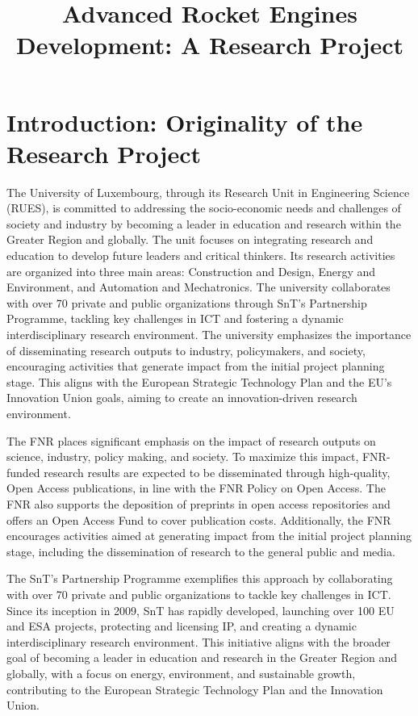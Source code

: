 \documentclass{article}
\title{Advanced Rocket Engines Development: A Research Project}
\author{}
\date{}
\begin{document}
\maketitle

\section{Introduction: Originality of the Research Project}

The University of Luxembourg, through its Research Unit in Engineering Science (RUES), is committed to addressing the socio-economic needs and challenges of society and industry by becoming a leader in education and research within the Greater Region and globally. The unit focuses on integrating research and education to develop future leaders and critical thinkers. Its research activities are organized into three main areas: Construction and Design, Energy and Environment, and Automation and Mechatronics. The university collaborates with over 70 private and public organizations through SnT’s Partnership Programme, tackling key challenges in ICT and fostering a dynamic interdisciplinary research environment. The university emphasizes the importance of disseminating research outputs to industry, policymakers, and society, encouraging activities that generate impact from the initial project planning stage. This aligns with the European Strategic Technology Plan and the EU's Innovation Union goals, aiming to create an innovation-driven research environment.

The FNR places significant emphasis on the impact of research outputs on science, industry, policy making, and society. To maximize this impact, FNR-funded research results are expected to be disseminated through high-quality, Open Access publications, in line with the FNR Policy on Open Access. The FNR also supports the deposition of preprints in open access repositories and offers an Open Access Fund to cover publication costs. Additionally, the FNR encourages activities aimed at generating impact from the initial project planning stage, including the dissemination of research to the general public and media.

The SnT’s Partnership Programme exemplifies this approach by collaborating with over 70 private and public organizations to tackle key challenges in ICT. Since its inception in 2009, SnT has rapidly developed, launching over 100 EU and ESA projects, protecting and licensing IP, and creating a dynamic interdisciplinary research environment. This initiative aligns with the broader goal of becoming a leader in education and research in the Greater Region and globally, with a focus on energy, environment, and sustainable growth, contributing to the European Strategic Technology Plan and the Innovation Union.
\end{document}
